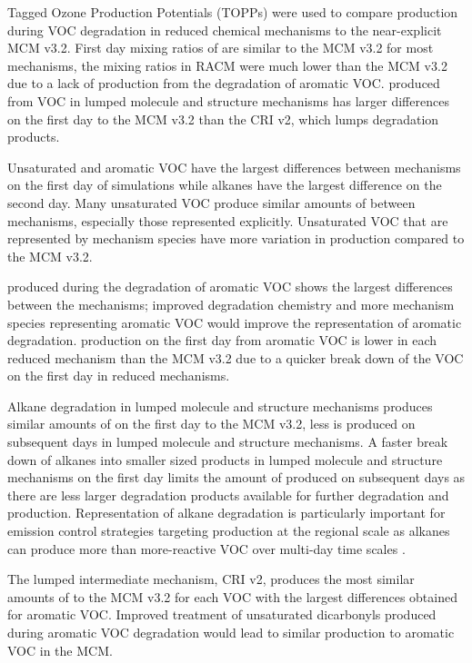 Tagged Ozone Production Potentials (TOPPs) were used to compare  production during VOC degradation in reduced chemical mechanisms to the near-explicit MCM v3.2. 
First day mixing ratios of  are similar to the MCM v3.2 for most mechanisms, the  mixing ratios in RACM were much lower than the MCM v3.2 due to a lack of  production from the degradation of aromatic VOC.
 produced from VOC in lumped molecule and structure mechanisms has larger differences on the first day to the MCM v3.2 than the CRI v2, which lumps degradation products.

Unsaturated and aromatic VOC have the largest differences between mechanisms on the first day of simulations while alkanes have the largest difference on the second day.
Many unsaturated VOC produce similar amounts of  between mechanisms, especially those represented explicitly.
Unsaturated VOC that are represented by mechanism species have more variation in  production compared to the MCM v3.2.

 produced during the degradation of aromatic VOC shows the largest differences between the mechanisms; improved degradation chemistry and more mechanism species representing aromatic VOC would improve the representation of aromatic degradation.
 production on the first day from aromatic VOC is lower in each reduced mechanism than the MCM v3.2 due to a quicker break down of the VOC on the first day in reduced mechanisms.

Alkane degradation in lumped molecule and structure mechanisms produces similar amounts of  on the first day to the MCM v3.2, less  is produced on subsequent days in lumped molecule and structure mechanisms.
A faster break down of alkanes into smaller sized products in lumped molecule and structure mechanisms on the first day limits the amount of  produced on subsequent days as there are less larger degradation products available for further degradation and  production.
Representation of alkane degradation is particularly important for emission control strategies targeting  production at the regional scale as alkanes can produce more  than more-reactive VOC over multi-day time scales \citep{Butler:2011}.

The lumped intermediate mechanism, CRI v2, produces the most similar amounts of  to the MCM v3.2 for each VOC with the largest differences obtained for aromatic VOC.
Improved treatment of unsaturated dicarbonyls produced during aromatic VOC degradation would lead to similar  production to aromatic VOC in the MCM.

